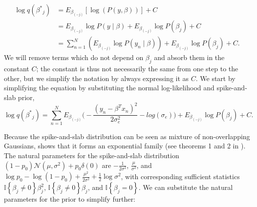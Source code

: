 \begin{align}
    \log q(\beta^{*}{_j}) &= E_{\beta_{(-j)}} [\log(P(y, \beta))] + C \nonumber \\
    &= E_{\beta_{(-j)}} \log P(y \mid \beta) + E_{\beta_{(-j)}} \log P(\beta_j) + C \nonumber \\
    &= \sum_{n=1}^N \left( E_{\beta_{(-j)}} \log P(y_n \mid \beta) \right) + E_{\beta_{(-j)}} \log P(\beta_j) + C \label{cavi-1}.
\end{align}
%
%
We will remove terms which do not depend on $\beta_j$ and absorb them in the constant $C$; the constant is thus not necessarily the same from one step to the other, but we simplify the notation by always expressing it as $C$.
%
We start by simplifying the equation by substituting the normal log-likelihood and spike-and-slab prior,
\begin{equation}
    \log q(\beta^{*}{_j}) = \sum_{n=1}^N E_{\beta_{(-j)}} \Big(- \frac{(y_n - \beta^T x_n)^2}{2 \sigma_e^2}  - log(\sigma_{e}) \Big)+ E_{\beta_{(-j)}}  \log P(\beta_j) + C.
\end{equation}

%
Because the spike-and-slab distribution can be seen as mixture of non-overlapping Gaussians, \cite{spence2020flexible} shows that it forms an exponential family (see theorems 1 and 2 in \cite{spence2020flexible}).
%
The natural parameters for the spike-and-slab distribution $(1-p_0) \mathcal{N}(\mu, \sigma^2) + p_0 \delta(0)$ are $-\frac{1}{2\sigma^2}$, $\frac{\mu}{\sigma^2}$, and $\log p_0 - \log (1-p_0) + \frac{\mu^2}{2\sigma^2} + \frac{1}{2}\log \sigma^2$, with corresponding sufficient statistics $\mathbb{I}\left\{\beta_j \ne 0\right\} \beta_j^2$, $\mathbb{I}\left\{\beta_j \ne 0\right\} \beta_j$, and $\mathbb{I}\left\{\beta_j = 0\right\}$.
%
We can substitute the natural parameters for the prior to simplify further:


